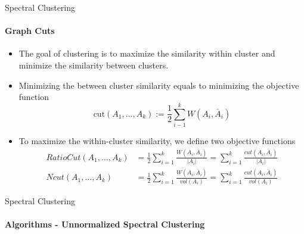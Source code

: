 \documentclass[10pt,a4paper, nocenter]{beamer}
\begin{document}
	\begin{frame}{Spectral Clustering}
		\framesubtitle{Graph Cuts}
		\begin{itemize}
			\item<1-> The goal of clustering is to maximize the similarity within cluster and minimize the similarity between clusters.
			\item<2-> Minimizing the between cluster similarity equals to minimizing the objective function $$  \text{cut}(A_{1}, \dots, A_{k}) := \frac{1}{2}\sum_{i-1}^{k}W(A_i,\bar{A}_{i}) $$
			\item<3-> To maximize the within-cluster similarity, we define two objective functions \begin{align} RatioCut(A_{1},\dots,A_{k}) &= \frac{1}{2} \sum_{i=1}^{k}\frac{W(A_{i},\bar{A}_{i})}{\lvert A_{i} \rvert}
			= \sum_{i=1}^{k}\frac{cut(A_{i},\bar{A}_{i})}{\lvert A_{i} \rvert} \\
			Ncut(A_{1},\dots,A_{k}) &= \frac{1}{2}\sum_{i=1}^{k}\frac{W(A_{i},\bar{A}_{i})}{vol(A_{i})} = 
			\sum_{i=1}^{k}\frac{cut(A_{i},\bar{A}_{i})}{vol(A_{i})} \end{align}
			
		\end{itemize}
	\end{frame}

	\begin{frame}{Spectral Clustering}
		\framesubtitle{Algorithms - Unnormalized Spectral Clustering}
    \begin{algorithm}[H]
		\DontPrintSemicolon

	\end{algorithm}


	\end{frame}
\end{document}
